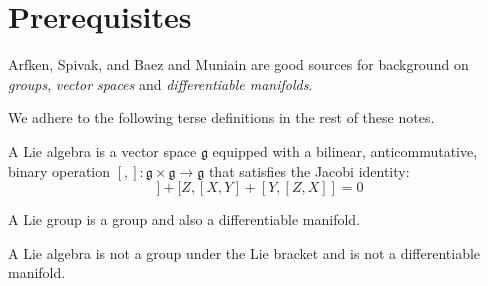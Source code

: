 
\chapter{Prerequisites}

\noindent Arfken,\cite{arfken2012} Spivak,\cite{spivak1965} and Baez and
Muniain\cite{baez1994gauge} are good sources for background on \textit{groups},
\textit{vector spaces} and \textit{differentiable manifolds}. 

We adhere to the following terse definitions in the rest of these notes.

\begin{definition}
    A Lie algebra is a vector space $\mathfrak{g}$ equipped with a bilinear,
    anticommutative, binary operation
    $[,]:\mathfrak{g}\times\mathfrak{g}\rightarrow\mathfrak{g}$ that satisfies
    the Jacobi identity:
    \begin{equation*}
        [X,[Y,Z]]+[Z,[X,Y]+[Y,[Z,X]]=0
    \end{equation*}
\end{definition}

\begin{definition}
    A Lie group is a group and also a differentiable manifold.
\end{definition}

\begin{remark}
A Lie algebra is not a group under the Lie bracket and is not a differentiable
manifold.
\end{remark}
